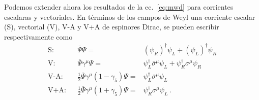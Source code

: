 Podemos extender ahora los resultados de la ec.~\eqref{eq:mwd} para corrientes escalaras y vectoriales. En términos de los campos de Weyl una corriente escalar (S),  vectorial (V), V-A y V+A de espinores Dirac, se pueden escribir respectivamente como
\begin{align}
\label{eq:8}
\text{S:} &&  \overline{\Psi}\Psi =& \left( \psi_R \right)^\dagger \psi_L+\left( \psi_L \right)^{\dagger}\psi_R \nonumber\\
\text{V:}& &  \overline{\Psi}\gamma^{\mu}\Psi=& \psi_L^{\dagger}\overline{\sigma}^{\mu}\psi_L+\psi_R^{\dagger}\sigma^{\mu}\psi_{R}\nonumber\\
\text{V-A:} &&  \tfrac{1}{2}\overline{\Psi}\gamma^{\mu}(1-\gamma_5)\Psi=& \psi_L^{\dagger}\overline{\sigma}^{\mu}\psi_L\nonumber\\
\text{V+A:} &&  \tfrac{1}{2}\overline{\Psi}\gamma^{\mu}(1+\gamma_5)\Psi=& \psi_R^{\dagger}{\sigma}^{\mu}\psi_L\,.
\end{align}

